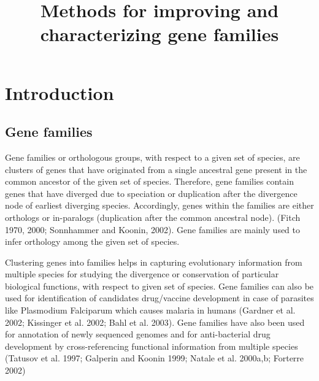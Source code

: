 \documentclass{article}
\date{}
\begin{document}
	\title{Methods for improving and characterizing gene families}
	\maketitle
	
	\section{Introduction}
		\subsection{Gene families}
		Gene families or orthologous groups, with respect to a given set of species, are clusters of genes that have originated from a single ancestral gene present in the common ancestor of the given set of species. Therefore, gene families contain genes that have diverged due to speciation or duplication after the divergence node of earliest diverging species. Accordingly, genes within the families are either orthologs or in-paralogs (duplication after the common ancestral node). (Fitch 1970, 2000; Sonnhammer and Koonin, 2002). Gene families are mainly used to infer orthology among the given set of species.
		
		Clustering genes into families helps in capturing evolutionary information from multiple species for studying the divergence or conservation of particular biological functions, with respect to given set of species. Gene families can also be used for identification of candidates drug/vaccine development in case of parasites like Plasmodium Falciparum which causes malaria in humans (Gardner et al. 2002; Kissinger et al. 2002; Bahl et al. 2003). Gene families have also been used for annotation of newly sequenced genomes and for anti-bacterial drug development by cross-referencing functional information from multiple species (Tatusov et al. 1997; Galperin and Koonin 1999; Natale et al. 2000a,b; Forterre 2002)
		
\end{document}
